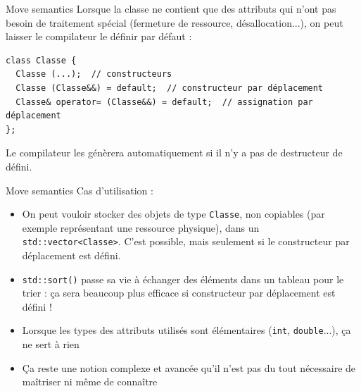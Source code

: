 \documentclass[c]{beamer}
\newcommand{\inline}[1]{\texttt{#1}}
\begin{document}
\begin{frame}[fragile]{Move semantics}
Lorsque la classe ne contient que des attributs qui n'ont pas besoin de traitement spécial (fermeture de ressource, désallocation...), on peut laisser le compilateur le définir par défaut :
\begin{verbatim}
class Classe {
  Classe (...);  // constructeurs
  Classe (Classe&&) = default;  // constructeur par déplacement
  Classe& operator= (Classe&&) = default;  // assignation par déplacement
};
\end{verbatim}
Le compilateur les génèrera automatiquement si il n'y a pas de destructeur de défini.
\end{frame}


\begin{frame}[fragile]{Move semantics}
Cas d'utilisation :
\begin{itemize}
  \item On peut vouloir stocker des objets de type \inline{Classe}, non copiables (par exemple représentant une ressource physique), dans un \inline{std::vector<Classe>}. C'est possible, mais seulement si le constructeur par déplacement est défini.
  \item \inline{std::sort()} passe sa vie à échanger des éléments dans un tableau pour le trier : ça sera beaucoup plus efficace si constructeur par déplacement est défini !
  \item Lorsque les types des attributs utilisés sont élémentaires (\inline{int}, \inline{double}...), ça ne sert à rien
  \item Ça reste une notion complexe et avancée qu'il n'est pas du tout nécessaire de maîtriser ni même de connaître
\end{itemize}
\end{frame}
\end{document}
